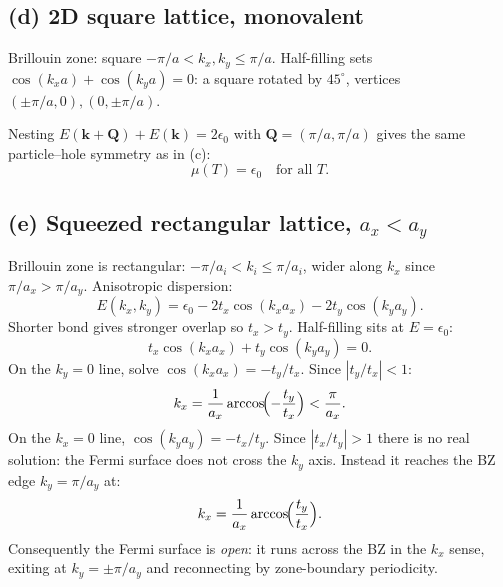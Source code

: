 \documentclass[11pt]{article}
\begin{document}
\subsection*{(d) 2D square lattice, monovalent}

Brillouin zone: square $-\pi/a < k_x,k_y \le \pi/a$. Half-filling sets $\cos(k_x a) + \cos(k_y a) = 0$: a square rotated by $45^\circ$, vertices $(\pm\pi/a,0),(0,\pm\pi/a)$.

\begin{center}
\end{center}

Nesting $E(\bm k+\bm Q)+E(\bm k) = 2\epsilon_0$ with $\bm Q=(\pi/a,\pi/a)$ gives the same particle--hole symmetry as in (c):
\[
\boxed{\;\mu(T) = \epsilon_0\quad\text{for all }T.\;}
\]

\subsection*{(e) Squeezed rectangular lattice, $a_x < a_y$}

Brillouin zone is rectangular: $-\pi/a_i < k_i \le \pi/a_i$, wider along $k_x$ since $\pi/a_x>\pi/a_y$. Anisotropic dispersion:
\[
E(k_x,k_y) = \epsilon_0 - 2t_x\cos(k_x a_x) - 2t_y\cos(k_y a_y).
\]
Shorter bond gives stronger overlap so $t_x > t_y$. Half-filling sits at $E = \epsilon_0$:
\[
t_x\cos(k_x a_x) + t_y\cos(k_y a_y) = 0.
\]
On the $k_y=0$ line, solve $\cos(k_x a_x) = -t_y/t_x$. Since $|t_y/t_x|<1$:
\[
k_x = \frac{1}{a_x}\arccos\!\Bigl(-\frac{t_y}{t_x}\Bigr) < \frac{\pi}{a_x}.
\]
On the $k_x=0$ line, $\cos(k_ya_y) = -t_x/t_y$. Since $|t_x/t_y|>1$ there is no real solution: the Fermi surface does not cross the $k_y$ axis. Instead it reaches the BZ edge $k_y=\pi/a_y$ at:
\[
k_x = \frac{1}{a_x}\arccos\!\Bigl(\frac{t_y}{t_x}\Bigr).
\]
Consequently the Fermi surface is \emph{open}: it runs across the BZ in the $k_x$ sense, exiting at $k_y=\pm\pi/a_y$ and reconnecting by zone-boundary periodicity.
\end{document}
